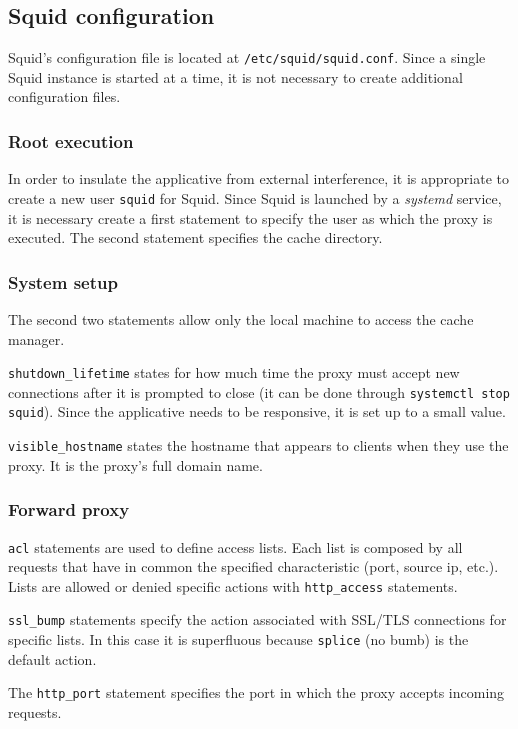 \documentclass[draft]{homework}
\newcommand{\sq}{Squid\xspace}
\begin{document}
    \subsection{Squid configuration}
    \sq's configuration file is located at \texttt{/etc/squid/squid.conf}.
    Since a single \sq instance is started at a time, it is not necessary to create additional configuration files.
    
    \subsubsection{Root execution}
    In order to insulate the applicative from external interference, it is appropriate to create a new user \texttt{squid} for \sq.
    Since \sq is launched by a \textit{systemd} service, it is necessary create a first statement to specify the user as which the proxy is executed.
    The second statement specifies the cache directory.
    
    \subsubsection{System setup}
    The second two statements allow only the local machine to access the cache manager.
    
    \texttt{shutdown\_lifetime} states for how much time the proxy must accept new connections after it is prompted to close (it can be done through \texttt{systemctl stop squid}).
    Since the applicative needs to be responsive, it is set up to a small value.
    
    \texttt{visible\_hostname} states the hostname that appears to clients when they use the proxy.
    It is the proxy's full domain name.
    
    \subsubsection{Forward proxy}
    \texttt{acl} statements are used to define access lists.
    Each list is composed by all requests that have in common the specified characteristic (port, source ip, etc.).
    Lists are allowed or denied specific actions with \texttt{http\_access} statements.
    
    \texttt{ssl\_bump} statements specify the action associated with SSL/TLS connections for specific lists.
    In this case it is superfluous because \texttt{splice} (no bumb) is the default action.
    
    The \texttt{http\_port} statement specifies the port in which the proxy accepts incoming requests.
    
\end{document}
